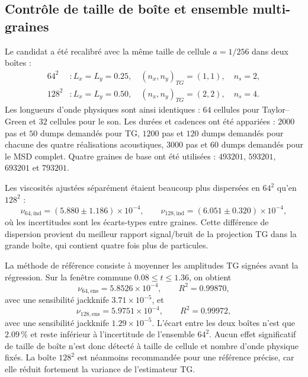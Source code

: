 \documentclass[11pt,a4paper]{article}
\begin{document}
\subsection{Contrôle de taille de boîte et ensemble multi-graines}

Le candidat a été recalibré avec la même taille de cellule $a=1/256$ dans deux boîtes :
\begin{equation}
\begin{aligned}
  64^2 &: L_x=L_y=0.25,\quad (n_x,n_y)_{TG}=(1,1),\quad n_{s}=2,\\
  128^2 &: L_x=L_y=0.50,\quad (n_x,n_y)_{TG}=(2,2),\quad n_{s}=4.
\end{aligned}
\end{equation}
Les longueurs d'onde physiques sont ainsi identiques : $64$ cellules pour Taylor--Green et $32$ cellules pour le son. Les durées et cadences ont été appariées : $2000$ pas et $50$ dumps demandés pour TG, $1200$ pas et $120$ dumps demandés pour chacune des quatre réalisations acoustiques, $3000$ pas et $60$ dumps demandés pour le MSD complet. Quatre graines de base ont été utilisées : $493201$, $593201$, $693201$ et $793201$.

Les viscosités ajustées séparément étaient beaucoup plus dispersées en $64^2$ qu'en $128^2$ :
\begin{equation}
  \nu_{64,\mathrm{ind}}=(5.880\pm1.186)\times10^{-4},
  \qquad
  \nu_{128,\mathrm{ind}}=(6.051\pm0.320)\times10^{-4},
\end{equation}
où les incertitudes sont les écarts-types entre graines. Cette différence de dispersion provient du meilleur rapport signal/bruit de la projection TG dans la grande boîte, qui contient quatre fois plus de particules.

La méthode de référence consiste à moyenner les amplitudes TG signées avant la régression. Sur la fenêtre commune $0.08\leq t\leq1.36$, on obtient
\begin{equation}
  \nu_{64,\mathrm{ens}}=5.8526\times10^{-4},
  \qquad R^2=0.99870,
\end{equation}
avec une sensibilité jackknife $3.71\times10^{-5}$, et
\begin{equation}
  \nu_{128,\mathrm{ens}}=5.9751\times10^{-4},
  \qquad R^2=0.99972,
\end{equation}
avec une sensibilité jackknife $1.29\times10^{-5}$. L'écart entre les deux boîtes n'est que $2.09\,\%$ et reste inférieur à l'incertitude de l'ensemble $64^2$. Aucun effet significatif de taille de boîte n'est donc détecté à taille de cellule et nombre d'onde physique fixés. La boîte $128^2$ est néanmoins recommandée pour une référence précise, car elle réduit fortement la variance de l'estimateur TG.
\end{document}
